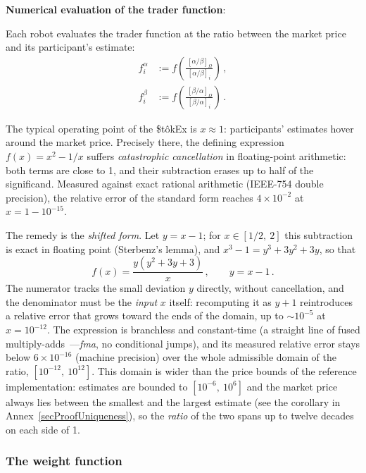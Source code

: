\documentclass[letterpaper]{article}
\newcommand{\priceAB}{\left[\alpha / \beta\right]}
\newcommand{\priceBA}{\left[\beta / \alpha\right]}
\newcommand{\StokEx}{\$t\^{o}kEx}
\begin{document}
\textbf{Numerical evaluation of the trader function}:

Each robot evaluates the trader function at the ratio between the market price and its participant's estimate:
\begin{align}
f_i^\alpha &:= f\!\left(\frac{\hspace{2pt}\priceAB_\Omega}{\priceAB_i} \right)\, , \nonumber \\
f_i^\beta &:= f\!\left(\frac{\hspace{2pt}\priceBA_\Omega}{\priceBA_i} \right) \, .
\label{eqFunctionX}
\end{align}

The typical operating point of the \StokEx{} is $x \approx 1$: participants' estimates hover around the market price. Precisely there, the defining expression $f(x) = x^2 - 1/x$ suffers \emph{catastrophic cancellation} in floating-point arithmetic:
both terms are close to 1, and their subtraction erases up to half of the significand. Measured against exact rational arithmetic (IEEE-754 double precision), the relative error of the standard form reaches $4 \times 10^{-2}$ at $x = 1 - 10^{-15}$.

The remedy is the \emph{shifted form}. Let $y = x - 1$; for $x \in [1/2,\ 2]$ this subtraction is exact in floating point (Sterbenz's lemma), and $x^3 - 1 = y^3 + 3y^2 + 3y$, so that
\begin{equation}
    f(x) = \frac{y\left(y^2 + 3y + 3\right)}{x}\,, \qquad y = x - 1\,. \label{eqShiftedForm}
\end{equation}
The numerator tracks the small deviation $y$ directly, without cancellation, and the denominator must be the \emph{input} $x$ itself: recomputing it as $y + 1$ reintroduces a relative error that grows toward the ends of the domain, up to $\sim 10^{-5}$ at $x = 10^{-12}$.
The expression is branchless and constant-time (a straight line of fused multiply-adds~---\emph{fma}, no conditional jumps), and its measured relative error stays below $6 \times 10^{-16}$ (machine precision) over the whole admissible domain of the ratio, $[10^{-12},\ 10^{12}]$.
This domain is wider than the price bounds of the reference implementation: estimates are bounded to $[10^{-6},\ 10^{6}]$ and the market price always lies between the smallest and the largest estimate (see the corollary in Annex~\ref{secProofUniqueness}),
so the \emph{ratio} of the two spans up to twelve decades on each side of 1.


\subsubsection{The weight function}
\end{document}

